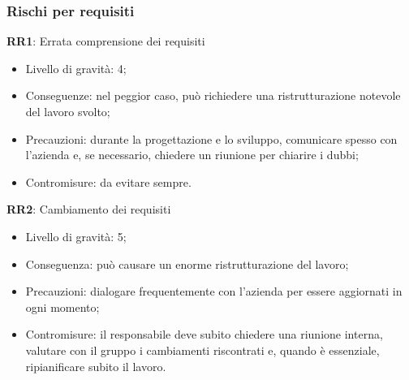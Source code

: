 \subsubsection{Rischi per requisiti}
\textbf{RR1}: 
Errata comprensione dei requisiti
\begin{itemize}
\item Livello di gravità: 4;
\item Conseguenze: nel peggior caso, può richiedere una ristrutturazione notevole del lavoro svolto;
\item Precauzioni: durante la progettazione e lo sviluppo, comunicare spesso con l’azienda e, se necessario, chiedere un riunione per chiarire i dubbi;
\item Contromisure: da evitare sempre.
\end{itemize}
\textbf{RR2}:
Cambiamento dei requisiti
\begin{itemize}
\item Livello di gravità: 5;
\item Conseguenza: può causare un enorme ristrutturazione del lavoro;
\item Precauzioni: dialogare frequentemente con l'azienda per essere aggiornati in ogni momento;
\item Contromisure: il responsabile deve subito chiedere una riunione interna, valutare con il gruppo i cambiamenti riscontrati e, quando è essenziale, ripianificare subito il lavoro.
\end{itemize}



